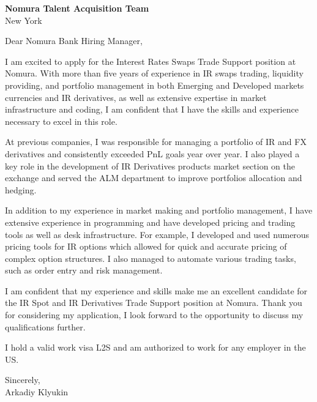 \documentclass{letter}
\begin{document}
\begin{letter}{\textbf{Nomura Talent Acquisition Team} \\
                New York }


\opening{Dear Nomura Bank Hiring Manager,}

I am excited to apply for the Interest Rates Swaps Trade Support position at Nomura. With more than five years of experience in IR swaps trading, liquidity providing, and portfolio management in both Emerging and Developed markets currencies and IR derivatives, as well as extensive expertise in market infrastructure and coding, I am confident that I have the skills and experience necessary to excel in this role.

At previous companies, I was responsible for managing a portfolio of IR and FX derivatives and consistently exceeded PnL goals year over year. I also played a key role in the development of IR Derivatives products market section on the exchange and served the ALM department to improve portfolios allocation and hedging.

In addition to my experience in market making and portfolio management, I have extensive experience in programming and have developed pricing and trading tools as well as desk infrastructure. For example, I developed and used numerous pricing tools for IR options which allowed for quick and accurate pricing of complex option structures. I also managed to automate various trading tasks, such as order entry and risk management.

I am confident that my experience and skills make me an excellent candidate for the IR Spot and IR Derivatives Trade Support position at Nomura. Thank you for considering my application, I look forward to the opportunity to discuss my qualifications further.

I hold a valid work visa L2S and am authorized to work for any employer in the US.

Sincerely,\\
Arkadiy Klyukin
\end{letter}
\end{document}
